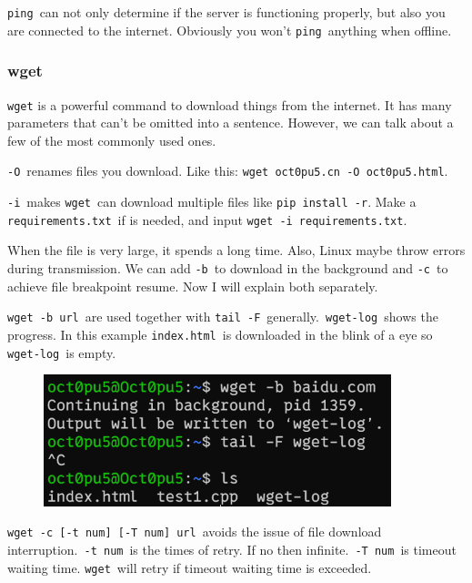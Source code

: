 \documentclass[12pt]{ctexart}
\begin{document}
\texttt{ping}\ can not only determine if the server is functioning
properly, but also you are connected to the internet. Obviously you
won't \texttt{ping}\ anything when offline.

\subsubsection{\textbf{wget}}

\texttt{wget} is a powerful command to download things from the
internet. It has many parameters that can't be omitted
into a sentence. However, we can talk about a few of the most commonly
used ones.

\texttt{-O}\ renames files you download. Like this:
\texttt{wget\ oct0pu5.cn\ -O\ oct0pu5.html}.

\texttt{-i}\ makes \texttt{wget}\ can download multiple files like
\texttt{pip\ install\ -r}. Make a \texttt{requirements.txt}\ if is
needed, and input \texttt{wget\ -i\ requirements.txt}.

When the file is very large, it spends a long time. Also, Linux maybe
throw errors during transmission. We can add \texttt{-b}\ to download in
the background and \texttt{-c}\ to achieve file breakpoint resume. Now I
will explain both separately.

\texttt{wget\ -b\ url}\ are used together with \texttt{tail\ -F}\
generally.\ \texttt{wget-log}\ shows the progress. In this example
\texttt{index.html}\ is downloaded in the blink of a eye so
\texttt{wget-log}\ is empty.

\begin{figure}[H]
    \centering
    \includegraphics[width=0.9\textwidth,keepaspectratio]{assets/Linux/1.9 Linux network commands/4.png}
\end{figure}

\texttt{wget\ -c\ {[}-t\ num{]}\ {[}-T\ num{]}\ url}\ avoids the issue of
file download interruption.\ \texttt{-t\ num}\ is the times of retry. If
no then infinite.\ \texttt{-T\ num}\ is timeout waiting time.
\texttt{wget}\ will retry if timeout waiting time is exceeded.
\end{document}
